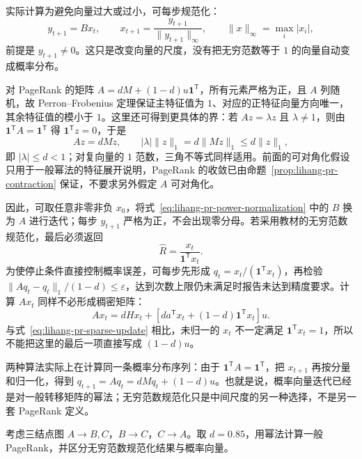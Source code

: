 实际计算为避免向量过大或过小，可每步规范化：
\begin{equation}
\label{eq:lihang-pr-power-normalization}
    y_{t+1}=Bx_t,\qquad
    x_{t+1}=\frac{y_{t+1}}{\|y_{t+1}\|_\infty},\qquad
    \|x\|_\infty=\max_i|x_i|,
\end{equation}
前提是 $y_{t+1}\neq0$。这只是改变向量的尺度，没有把无穷范数等于 $1$ 的向量自动变成概率分布。

对 PageRank 的矩阵 $A=dM+(1-d)u\boldsymbol1^{\mathsf T}$，所有元素严格为正，且 $A$ 列随机，故 Perron--Frobenius 定理保证主特征值为 $1$、对应的正特征向量方向唯一，其余特征值的模小于 $1$。这里还可得到更具体的界：若 $Az=\lambda z$ 且 $\lambda\neq1$，则由 $\boldsymbol1^{\mathsf T}A=\boldsymbol1^{\mathsf T}$ 得 $\boldsymbol1^{\mathsf T}z=0$，于是
\[
    Az=dMz,\qquad |\lambda|\|z\|_1=d\|Mz\|_1\leq d\|z\|_1,
\]
即 $|\lambda|\leq d<1$；对复向量的 $1$ 范数，三角不等式同样适用。前面的可对角化假设只用于一般幂法的特征展开说明，PageRank 的收敛已由命题~\ref{prop:lihang-pr-contraction} 保证，不要求另外假定 $A$ 可对角化。

因此，可取任意非零非负 $x_0$，将式~\eqref{eq:lihang-pr-power-normalization} 中的 $B$ 换为 $A$ 进行迭代；每步 $y_{t+1}$ 严格为正，不会出现零分母。若采用教材的无穷范数规范化，最后必须返回
\begin{equation}
\label{eq:lihang-pr-power-probability}
    \widehat R=\frac{x_t}{\boldsymbol1^{\mathsf T}x_t}.
\end{equation}
为使停止条件直接控制概率误差，可每步先形成 $q_t=x_t/(\boldsymbol1^{\mathsf T}x_t)$，再检验 $\|Aq_t-q_t\|_1/(1-d)\leq\varepsilon$，达到次数上限仍未满足时报告未达到精度要求。计算 $Ax_t$ 同样不必形成稠密矩阵：
\begin{equation}
\label{eq:lihang-pr-power-sparse}
    Ax_t=dHx_t+
    \left[da^{\mathsf T}x_t+(1-d)\boldsymbol1^{\mathsf T}x_t\right]u.
\end{equation}
与式~\eqref{eq:lihang-pr-sparse-update} 相比，未归一的 $x_t$ 不一定满足 $\boldsymbol1^{\mathsf T}x_t=1$，所以不能把这里的最后一项直接写成 $(1-d)u$。

两种算法实际上在计算同一条概率分布序列：由于 $\boldsymbol1^{\mathsf T}A=\boldsymbol1^{\mathsf T}$，把 $x_{t+1}$ 再按分量和归一化，得到 $q_{t+1}=Aq_t=dMq_t+(1-d)u$。也就是说，概率向量迭代已经是对一般转移矩阵的幂法；无穷范数规范化只是中间尺度的另一种选择，不是另一套 PageRank 定义。

\begin{example}
\label{ex:lihang-pr-power-three}
考虑三结点图 $A\to B,C$，$B\to C$，$C\to A$。取 $d=0.85$，用幂法计算一般 PageRank，并区分无穷范数规范化结果与概率向量。
\end{example}

